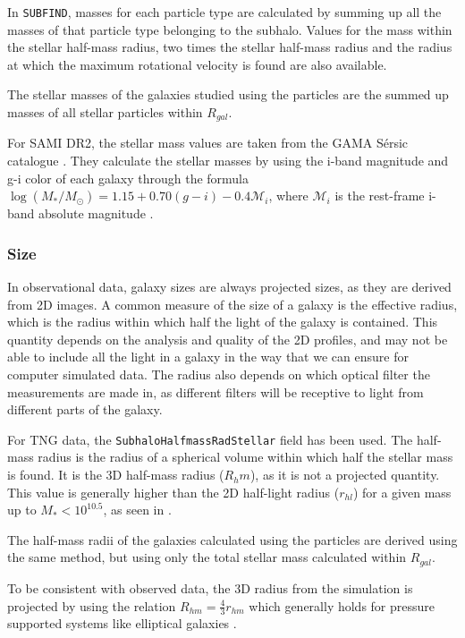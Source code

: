 In \texttt{SUBFIND}, masses for each particle type are calculated by summing up all the masses of that particle type belonging to the subhalo. Values for the mass within the stellar half-mass radius, two times the stellar half-mass radius and the radius at which the maximum rotational velocity is found are also available.

The stellar masses of the galaxies studied using the particles are the summed up masses of all stellar particles within $R_{gal}$.

For SAMI DR2, the stellar mass values are taken from the GAMA Sérsic catalogue \parencite{Driver2011}. They calculate the stellar masses by using the i-band magnitude and g-i color of each galaxy through the formula $\log(M_*/M_\odot) = 1.15 + 0.70(g-i) -0.4\mathcal{M}_i$, where $\mathcal{M}_i$ is the rest-frame i-band absolute magnitude \parencite{Taylor2011}.

\subsubsection{Size}

In observational data, galaxy sizes are always projected sizes, as they are derived from 2D images. A common measure of the size of a galaxy is the effective radius, which is the radius within which half the light of the galaxy is contained. This quantity depends on the analysis and quality of the 2D profiles, and may not be able to include all the light in a galaxy in the way that we can ensure for computer simulated data. The radius also depends on which optical filter the measurements are made in, as different filters will be receptive to light from different parts of the galaxy.

For TNG data, the \texttt{SubhaloHalfmassRadStellar} field has been used. The half-mass radius is the radius of a spherical volume within which half the stellar mass is found. It is the 3D half-mass radius ($R_hm$), as it is not a projected quantity. This value is generally higher than the 2D half-light radius ($r_{hl}$) for a given mass up to $M_{*} < 10^{10.5}$, as seen in \textcite{Genel2017}. 

The half-mass radii of the galaxies calculated using the particles are derived using the same method, but using only the total stellar mass calculated within $R_{gal}$.

To be consistent with observed data, the 3D radius from the simulation is projected by using the relation $R_{hm} = \frac{4}{3}r_{hm}$ which generally holds for pressure supported systems like elliptical galaxies \parencite{Wolf2010}.


